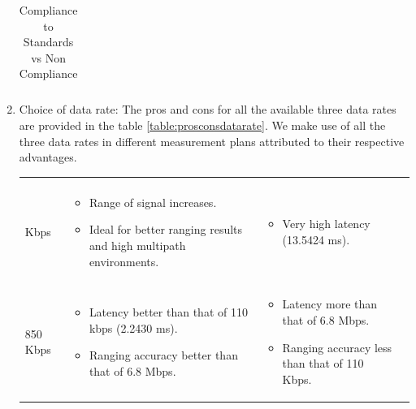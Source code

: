 \begin{enumerate}
\begin{table}
\begin{longtable}{| p{2.55cm}  | p{4.8cm} | p{5cm} | p{5cm} |}
       \end{longtable}
       \caption{Compliance to Standards vs Non Compliance}
       \label{table:ComplianceStandardsvsNonCompliance}
   \end{table}
    
    \item Choice of data rate: The pros and cons for all the available three data rates are provided in the table \ref{table:prosconsdatarate}. We make use of all the three data rates in different measurement plans attributed to their respective advantages.
   \begin{table}
       \centering
       \begin{longtable}{| p{2.55cm}  | p{4.8cm} | p{5cm} | p{5cm} |}
           \hline
           \centering {\textbf{Data Rate Parameter} }& \centering {\textbf{Pros}     }                                                                                                                                                                                               & \centering {\textbf{Cons}      }                                                                                                          \\ \vspace{-3mm}\hline
           110 Kbps                     & \vspace{-7mm} \begin{itemize}[leftmargin=*] \item Range of signal increases. \item Ideal for better ranging results and high multipath environments.\end{itemize}                                                                       & \vspace{-7mm} \begin{itemize}[leftmargin=*] \item Very high latency (13.5424 ms). \end{itemize}                                                                                            \\ \hline
           850 Kbps                     & \vspace{-7mm} \begin{itemize}[leftmargin=*] \item Latency better than that of 110 kbps (2.2430 ms). \item Ranging accuracy better than that of 6.8 Mbps. \end{itemize}                                                                     & \vspace{-7mm} \begin{itemize}[leftmargin=*] \item Latency more than that of 6.8 Mbps. \item Ranging accuracy less than that of 110 Kbps.\end{itemize} \\ \hline

\end{longtable}
\end{table}
\end{enumerate}

